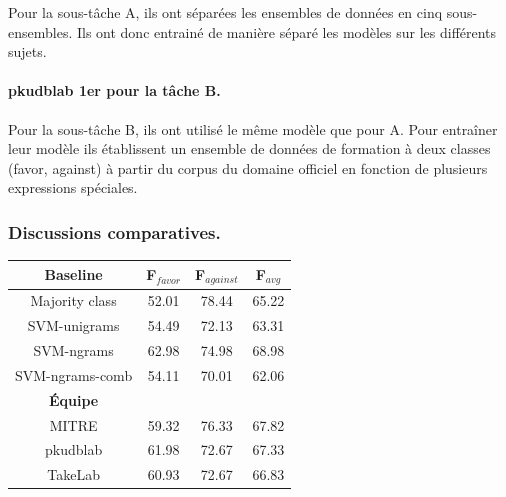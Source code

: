 \documentclass[onecolumn, 12pt]{article}
\begin{document}
Pour la sous-tâche A, ils ont séparées les ensembles de données en cinq sous-ensembles.
Ils ont donc entrainé de manière séparé les modèles sur les différents sujets.

\paragraph{pkudblab 1er pour la tâche B.}

Pour la sous-tâche B, ils ont utilisé le même modèle que pour A.
Pour entraîner leur modèle ils établissent un ensemble de données de formation à deux classes (favor, against) à partir du corpus du domaine officiel en fonction de plusieurs expressions spéciales.

\subsubsection{Discussions comparatives.}
\begin{center}
 \begin{tabular}{| c | c | c || c |}
  \hline
  \textbf{Baseline} & \textbf{F$_{favor}$} & \textbf{F$_{against}$} & \textbf{F$_{avg}$} \\
  \hline
  Majority class    & 52.01                & 78.44                  & 65.22              \\
  SVM-unigrams      & 54.49                & 72.13                  & 63.31              \\
  SVM-ngrams        & 62.98                & 74.98                  & 68.98              \\
  SVM-ngrams-comb   & 54.11                & 70.01                  & 62.06              \\
  \hline
  \textbf{Équipe}  &                      &                        &                    \\
  \hline
  MITRE             & 59.32                & 76.33                  & 67.82              \\
  pkudblab          & 61.98                & 72.67                  & 67.33              \\
  TakeLab           & 60.93                & 72.67                  & 66.83              \\
  \hline
 \end{tabular}
\end{center}
\end{document}
